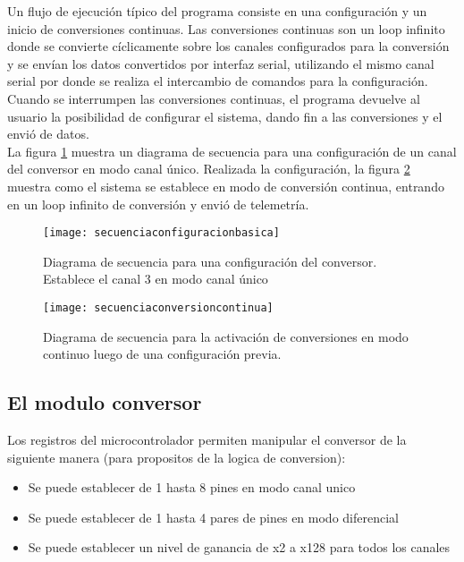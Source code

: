 Un flujo de ejecución típico del programa consiste en una configuración y un inicio de conversiones continuas. Las conversiones continuas son un loop infinito donde se convierte cíclicamente sobre los canales configurados para la conversión y se envían los datos convertidos por interfaz serial, utilizando el mismo canal serial por donde se realiza el intercambio de comandos para la configuración. Cuando se interrumpen las conversiones continuas, el programa devuelve al usuario la posibilidad de configurar el sistema, dando fin a las conversiones y el envió de datos. \\

La figura \ref{fig:secuenciaconfiguracionbasica} muestra un diagrama de secuencia para una configuración de un canal del conversor en modo canal único. Realizada la configuración, la figura \ref{fig:secuenciaconversioncontinua} muestra como el sistema se establece en modo de conversión continua, entrando en un loop infinito de conversión y envió de telemetría.

\begin{figure}[h]
  \centering
  \texttt{[image: secuenciaconfiguracionbasica]}
  \caption{Diagrama de secuencia para una configuración del conversor. Establece el canal 3 en modo canal único}\label{fig:secuenciaconfiguracionbasica}
\end{figure}

\begin{figure}[h]
  \centering
  \texttt{[image: secuenciaconversioncontinua]}
  \caption{Diagrama de secuencia para la activación de conversiones en modo continuo luego de una configuración previa.}\label{fig:secuenciaconversioncontinua}
\end{figure}



\subsection{El modulo conversor} %
\label{it2:sub:el_modulo_conversor}

Los registros del microcontrolador permiten manipular el conversor de la siguiente manera (para propositos de la logica de conversion):

\begin{itemize}
  \item Se puede establecer de 1 hasta 8 pines en modo canal unico
  \item Se puede establecer de 1 hasta 4 pares de pines en modo diferencial
  \item Se puede establecer un nivel de ganancia de x2 a x128 para todos los canales
\end{itemize}

